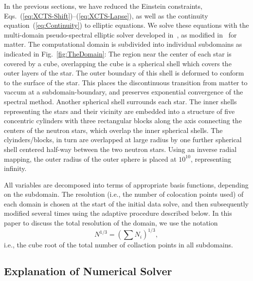 \documentclass[aps,prd,amsmath,floatfix
,twocolumn
,superscriptaddress,nofootinbib,showpacs]{revtex4-1}
\theoremstyle{plain} \newtheorem{thm}{Theorem} \newtheorem{lem}{Lemma}
\begin{document}
In the previous sections, we have reduced the Einstein
  constraints, Eqs.~(\ref{eq:XCTS-Shift})--(\ref{eq:XCTS-Lapse}), as
  well as the continuity equation~(\ref{eq:Continuity}) to elliptic
  equations.  We solve these equations with the multi-domain
  pseudo-spectral elliptic solver developed in~\cite{Pfeiffer2003}, as
  modified in~\cite{FoucartEtAl:2008} for matter.  The
  computational domain is subdivided into individual subdomains as
  indicated in Fig.~\ref{fig:TheDomain}: The region near the center of
  each star is covered by a cube, overlapping the cube is a spherical
  shell which covers the outer layers of the star.  The outer boundary
  of this shell is deformed to conform to the surface of the star.
  This places the discontinuous transition from matter to vaccum at a
  subdomain-boundary, and preserves exponential convergence of the
  spectral method.  Another spherical shell surrounds each star.  The
  inner shells representing the stars and their vicinity are embedded
  into a structure of five concentric cylinders with three rectangular
  blocks along the axis connecting the centers of the neutron stars,
  which overlap the inner spherical shells.  The clyinders/blocks, in
  turn are overlapped at large radius by one further spherical shell
  centered half-way between the two neutron stars.  Using an inverse radial mapping, the outer radius of the outer sphere is placed at $10^{10}$, representing infinity.

  All variables are decomposed into terms of
appropriate basis functions, depending on the subdomain. The
resolution (i.e., the number of colocation points used) of each domain
is chosen at the start of the initial data solve, and then
subsequently modified several times using the adaptive procedure
described below. In this paper to discuss the total resolution of the
domain, we use the notation 
\begin{equation}
N^{1/3} = \left(\sum
N_i\right)^{1/3},
\end{equation}i.e., the cube root of the total number of
collaction points in all subdomains.  

\subsection{Explanation of Numerical Solver}
\label{sec:IDalgorithm}
\end{document}

